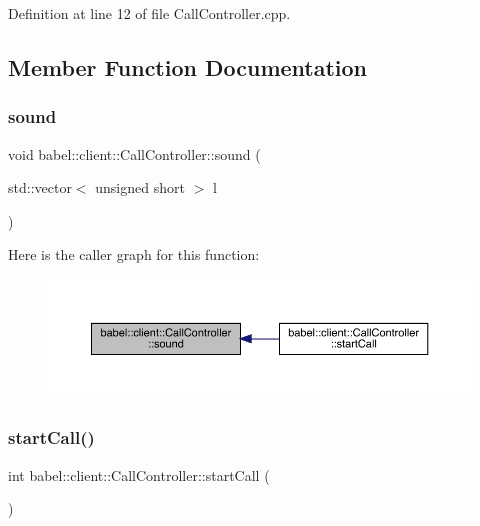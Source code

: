 Definition at line 12 of file Call\+Controller.\+cpp.



\subsection{Member Function Documentation}
\mbox{\label{classbabel_1_1client_1_1_call_controller_ac230bb212b81b400d317f7463a548e73}} 
\subsubsection{\texorpdfstring{sound}{sound}}
{\footnotesize\ttfamily void babel\+::client\+::\+Call\+Controller\+::sound (\begin{DoxyParamCaption}\item[{std\+::vector$<$ unsigned short $>$}]{l }\end{DoxyParamCaption})\hspace{0.3cm}{\ttfamily [signal]}}

Here is the caller graph for this function\+:\nopagebreak
\begin{figure}[H]
\begin{center}
\leavevmode
\includegraphics[width=350pt]{classbabel_1_1client_1_1_call_controller_ac230bb212b81b400d317f7463a548e73_icgraph}
\end{center}
\end{figure}
\mbox{\label{classbabel_1_1client_1_1_call_controller_ad5957a47309c9a12a5d37253c917bbb2}} 
\subsubsection{\texorpdfstring{start\+Call()}{startCall()}}
{\footnotesize\ttfamily int babel\+::client\+::\+Call\+Controller\+::start\+Call (\begin{DoxyParamCaption}{ }\end{DoxyParamCaption})}



